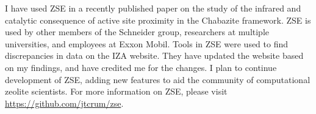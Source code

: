 \documentclass[11pt]{article}
\begin{document}
I have used ZSE in a recently published paper on the study of the infrared and catalytic consequence of active site proximity in the Chabazite framework. \cite{kester-2021-effec-broen} ZSE is used by other members of the Schneider group, researchers at multiple universities, and employees at Exxon Mobil. Tools in ZSE were used to find discrepancies in data on the IZA website. They have updated the website based on my findings, and have credited me for the changes. I plan to continue development of ZSE, adding new features to aid the community of computational zeolite scientists. For more information on ZSE, please visit \url{https://github.com/jtcrum/zse}.



\end{document}

